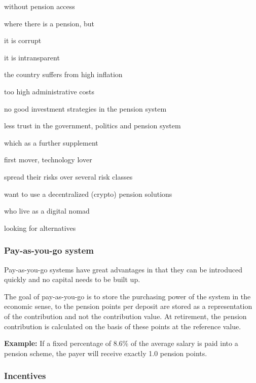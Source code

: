 \begin{compactitem}
\item without pension access
\item where there is a pension, but
 \begin{compactitem}
 \item it is corrupt
 \item it is intransparent
 \item the country suffers from high inflation
 \item too high administrative costs
 \item no good investment strategies in the pension system
 \item less trust in the government, politics and pension system
 \end{compactitem}
\item which as a further supplement 
 \begin{compactitem}
 \item first mover, technology lover
 \item spread their risks over several risk classes
 \item want to use a decentralized (crypto) pension solutions
 \item who live as a digital nomad
 \item looking for alternatives
 \end{compactitem}
\end{compactitem}

\subsubsection{Pay-as-you-go system}


Pay-as-you-go systems have great advantages in that they can be introduced quickly and no capital needs to be built up.

The goal of pay-as-you-go is to store the purchasing power of the system in the economic sense, to the pension points per deposit are stored as a representation of the contribution and not the contribution value.
At retirement, the pension contribution is calculated on the basis of these points at the reference value.

\textbf{Example:} If a fixed percentage of 8.6\% of the average salary is paid into a pension scheme, the payer will receive exactly 1.0 pension points.


\subsubsection{Incentives}


